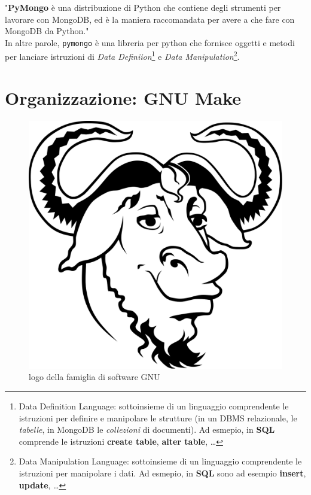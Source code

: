         "\textbf{PyMongo} è una distribuzione di Python che contiene degli strumenti per lavorare con MongoDB, ed è la maniera raccomandata per avere a che fare con MongoDB da Python." \\

        In altre parole, \texttt{pymongo} è una libreria per python che fornisce oggetti e metodi per lanciare istruzioni di \textit{Data Definiion}\footnote{Data Definition Language: sottoinsieme di un linguaggio comprendente le istruzioni per definire e manipolare le strutture (in un DBMS relazionale, le \textit{tabelle}, in MongoDB le \textit{collezioni} di documenti). Ad esmepio, in \textbf{SQL} comprende le istruzioni \textbf{create table}, \textbf{alter table}, \ldots} e \textit{Data Manipulation}\footnote{Data Manipulation Language: sottoinsieme di un linguaggio comprendente le istruzioni per manipolare i dati. Ad esmepio, in \textbf{SQL} sono ad esempio \textbf{insert}, \textbf{update}, \ldots}.

\section{Organizzazione: GNU Make}

    \begin{figure}
        \centering
        \caption{logo della famiglia di software GNU}
        \label{make}
        \includegraphics[scale=0.12]{img/gnu.png}
    \end{figure}

